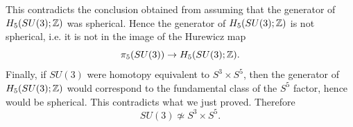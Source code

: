 \documentclass[12pt]{article}
\begin{document}
\begin{solution}
    This contradicts the conclusion obtained from assuming that the generator of $H_5(SU(3);\mathbb{Z})$ was spherical. Hence the generator of $H_5(SU(3);\mathbb{Z})$ is not spherical, i.e. it is not in the image of the Hurewicz map
    \[
        \pi_5(SU(3))\to H_5(SU(3);\mathbb{Z}).
    \] Finally, if $SU(3)$ were homotopy equivalent to $S^3\times S^5$, then the generator of $H_5(SU(3);\mathbb{Z})$ would correspond to the fundamental class of the $S^5$ factor, hence would be spherical. This contradicts what we just proved. Therefore
    \[
        SU(3)\not\simeq S^3\times S^5.
    \]
\end{solution}
\end{document}
